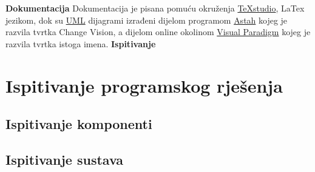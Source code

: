 			 \newline \textbf{Dokumentacija} \newline
			 Dokumentacija je pisana pomuću okruženja \href{https://www.texstudio.org/}{TeXstudio}, LaTex jezikom, dok su \href{https://www.uml-diagrams.org/}{UML} dijagrami izrađeni dijelom programom \href{https://astah.net/}{Astah} kojeg je razvila tvrtka Change Vision, a dijelom online okolinom \href{https://www.visual-paradigm.com/}{Visual Paradigm} kojeg je razvila tvrtka istoga imena.
			 \newline \textbf{Ispitivanje} \newline
			 
			 
			\eject 
		
		\section{Ispitivanje programskog rješenja}
			
			
	
			
			\subsection{Ispitivanje komponenti}
			
			
			
			\subsection{Ispitivanje sustava}
			
			 
